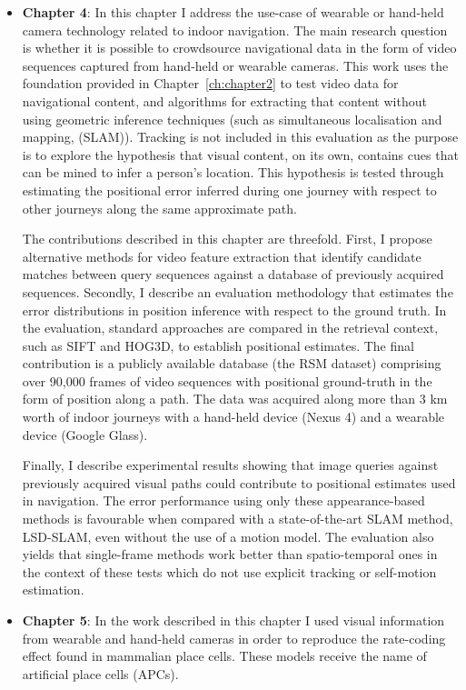\begin{itemize}

\item \textbf{Chapter 4}: In this chapter I address the use-case of wearable or hand-held camera technology related to indoor navigation. The main research question is whether it is possible to crowdsource navigational data in the form of video sequences captured from hand-held or wearable cameras.  This work uses the foundation provided in Chapter~\ref{ch:chapter2} to test video data for navigational content, and algorithms for extracting that content without using geometric inference techniques (such as simultaneous localisation and mapping, (SLAM)).  Tracking is not included in this evaluation as the purpose is to explore the hypothesis that visual content, on its own, contains cues that can be mined to infer a person's location.  This hypothesis is tested through estimating the positional error inferred during one journey with respect to other journeys along the same approximate path.

The contributions described in this chapter are threefold. First, I propose alternative methods for video feature extraction that identify candidate matches between query sequences against a database of previously acquired sequences. Secondly, I describe an evaluation methodology that estimates the error distributions in position inference with respect to the ground truth. In the evaluation, standard approaches are compared in the retrieval context, such as SIFT and HOG3D, to establish positional estimates. The final contribution is a publicly available database (the RSM dataset) comprising over 90,000 frames of video sequences with positional ground-truth in the form of position along a path. The data was acquired along more than 3 km worth of indoor journeys with a hand-held device (Nexus 4) and a wearable device (Google Glass).

Finally, I describe experimental results showing that image queries against previously acquired visual paths could contribute to positional estimates used in navigation. The error performance using only these appearance\--based me\-thods is favourable when compared with a state\--of\--the\--art SLAM method, LSD-SLAM, even without the use of a motion model. The evaluation also yields that single-frame methods work better than spatio-temporal ones in the context of these tests which do not use explicit tracking or self-motion estimation. 

\item \textbf{Chapter 5}: In the work described in this chapter I used visual information from wearable and hand-held cameras in order to reproduce the rate-coding effect found in mammalian place cells. These models receive the name of artificial place cells (APCs). 


\end{itemize}
